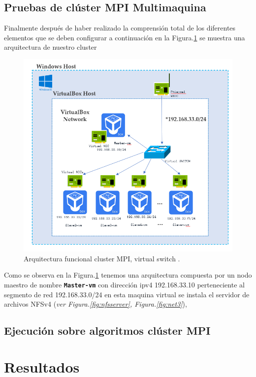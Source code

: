 \documentclass[letterpaper, 12pt, oneside]{article}
\begin{document}
    \subsection{Pruebas de clúster MPI Multimaquina}
    Finalmente después de haber realizado la comprensión total de los diferentes elementos que se deben configurar a continuación en la Figura.\ref{fig:clus0} se muestra una arquitectura de nuestro cluster  
    \begin{figure}[H]
            \includegraphics[scale=1.5]{img/cluster/cluster1.png}
            \caption{Arquitectura funcional cluster MPI, virtual switch .}
            \label{fig:clus0}
    \end{figure}
    Como se observa en la Figura.\ref{fig:clus0} tenemos una arquitectura compuesta por un nodo maestro de nombre \textbf{\texttt{Master-vm}} con dirección ipv4 192.168.33.10 perteneciente al segmento de red 192.168.33.0/24 en esta maquina virtual se instala el servidor de archivos NFSv4 (\textit{ver Figura.\ref{fig:nfsserver}, Figura.\ref{fig:net3}}), 
    
    \subsection{Ejecución sobre algoritmos clúster MPI}
    
    \clearpage
    
    \section{Resultados}
    
\end{document}
